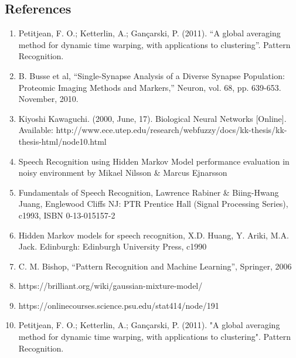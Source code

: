 \documentclass[12pt, a4paper, twoside]{report}
\begin{document}
\subsection*{References}
\begin{enumerate}[label=(\arabic*), noitemsep]
\item Petitjean, F. O.; Ketterlin, A.; Gançarski, P. (2011). ``A global averaging method for dynamic time warping, with applications to clustering''. Pattern Recognition.
\item B. Busse et al, ``Single-Synapse Analysis of a Diverse Synapse Population: Proteomic Imaging Methods and Markers,'' Neuron, vol. 68, pp. 639-653. November, 2010.
\item Kiyoshi Kawaguchi. (2000, June, 17). Biological Neural Networks [Online]. Available: http://www.ece.utep.edu/research/webfuzzy/docs/kk-thesis/kk-thesis-html/node10.html
\item Speech Recognition using Hidden Markov Model performance evaluation in noisy environment by Mikael Nilsson \& Marcus Ejnarsson
\item Fundamentals of Speech Recognition, Lawrence Rabiner \& Biing-Hwang Juang, Englewood Cliffs NJ: PTR Prentice Hall (Signal Processing Series), c1993, ISBN 0-13-015157-2
\item Hidden Markov models for speech recognition, X.D. Huang, Y. Ariki, M.A. Jack. Edinburgh: Edinburgh University Press, c1990
\item C. M. Bishop, ``Pattern Recognition and Machine Learning'', Springer, 2006
\item https://brilliant.org/wiki/gaussian-mixture-model/
\item https://onlinecourses.science.psu.edu/stat414/node/191
\item Petitjean, F. O.; Ketterlin, A.; Gançarski, P. (2011). "A global averaging method for dynamic time warping, with applications to clustering". Pattern Recognition.
\end{enumerate}
\end{document}
